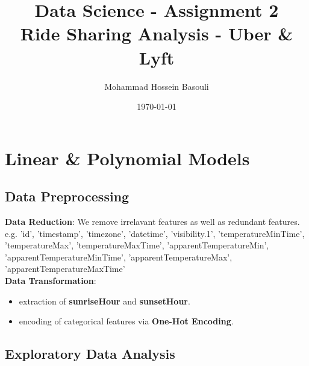\documentclass[a4paper,12pt]{article}
\begin{document}
\title{Data Science - Assignment 2 \\
Ride Sharing Analysis - Uber \& Lyft}
\author{Mohammad Hossein Basouli}
\date{\today}
\maketitle

\section*{Linear \& Polynomial Models}

\subsection*{Data Preprocessing}

\textbf{Data Reduction}: We remove irrelavant features as well as redundant features. e.g. 'id', 'timestamp', 'timezone', 'datetime', 'visibility.1',
'temperatureMinTime', 'temperatureMax', 'temperatureMaxTime',
'apparentTemperatureMin', 'apparentTemperatureMinTime',
'apparentTemperatureMax', 'apparentTemperatureMaxTime' \\ 

\noindent\textbf{Data Transformation}: 
\begin{itemize}
    \item extraction of \textbf{sunriseHour} and \textbf{sunsetHour}.
    \item encoding of categorical features via \textbf{One-Hot Encoding}.
\end{itemize}

\subsection*{Exploratory Data Analysis}
\end{document}
